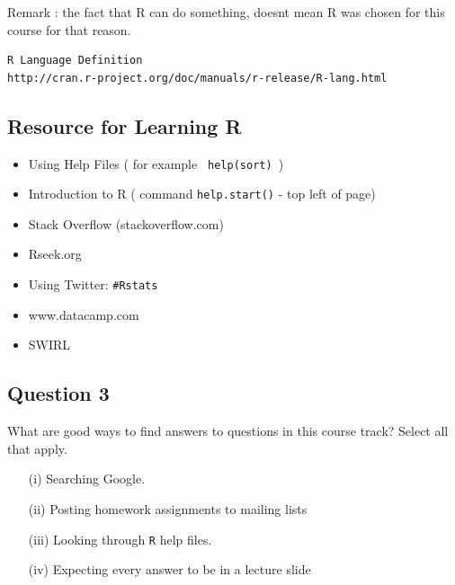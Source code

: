 \documentclass[12pt]{article}
\begin{document}
Remark : the fact that R can do something, doesnt mean R was chosen for this course for that reason.
\begin{verbatim}
R Language Definition
http://cran.r-project.org/doc/manuals/r-release/R-lang.html
\end{verbatim}
\newpage
\subsection*{Resource for Learning R}


\begin{itemize}
\item  Using Help Files ( for example \texttt{ help(sort) })
\item Introduction to R ( command \texttt{help.start()} - top left of page)
\item Stack Overflow (stackoverflow.com)
\item Rseek.org
\item Using Twitter: \texttt{\#Rstats}
\item www.datacamp.com
\item SWIRL
\end{itemize}

\newpage
\subsection*{Question 3}
 
What are good ways to find answers to questions in this course track? Select all that apply. 

\begin{itemize}

\item[(i)] Searching Google. 

\item[(ii)]  Posting homework assignments to mailing lists 

\item[(iii)] Looking through \texttt{R} help files. 

\item[(iv)] Expecting every answer to be in a lecture slide 
\end{itemize}

\newpage
\end{document}
